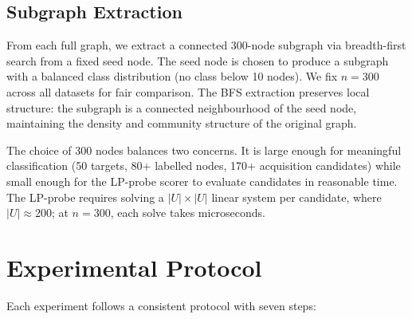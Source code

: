 \documentclass[12pt,a4paper,oneside]{report}
\begin{document}
\subsection{Subgraph Extraction}

From each full graph, we extract a connected 300-node subgraph via breadth-first search from a fixed seed node. The seed node is chosen to produce a subgraph with a balanced class distribution (no class below 10 nodes). We fix $n = 300$ across all datasets for fair comparison. The BFS extraction preserves local structure: the subgraph is a connected neighbourhood of the seed node, maintaining the density and community structure of the original graph.

The choice of 300 nodes balances two concerns. It is large enough for meaningful classification (50 targets, 80+ labelled nodes, 170+ acquisition candidates) while small enough for the LP-probe scorer to evaluate candidates in reasonable time. The LP-probe requires solving a $|U| \times |U|$ linear system per candidate, where $|U| \approx 200$; at $n = 300$, each solve takes microseconds.

\section{Experimental Protocol}

Each experiment follows a consistent protocol with seven steps:
\end{document}
